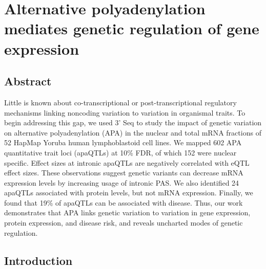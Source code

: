 \chapter{Alternative polyadenylation mediates genetic regulation of gene expression}\label{ch:tb}
\section[Abstract]{Abstract\footnotemark}



Little is known about co-transcriptional or post-transcriptional regulatory mechanisms linking noncoding variation to variation in organismal traits. To begin addressing this gap, we used 3' Seq to study the impact of genetic variation on alternative polyadenylation (APA) in the nuclear and total mRNA fractions of 52 HapMap Yoruba human lymphoblastoid cell lines. We mapped 602 APA quantitative trait loci (apaQTLs) at 10\% FDR, of which 152 were nuclear specific. Effect sizes at intronic apaQTLs are negatively correlated with eQTL effect sizes. These observations suggest genetic variants can decrease mRNA expression levels by increasing usage of intronic PAS. We also identified 24 apaQTLs associated with protein levels, but not mRNA expression. Finally, we found that 19\% of apaQTLs can be associated with disease. Thus, our work demonstrates that APA links genetic variation to variation in gene expression, protein expression, and disease risk, and reveals uncharted modes of genetic regulation.



\clearpage


\section{Introduction}\label{ch02-introduction}

